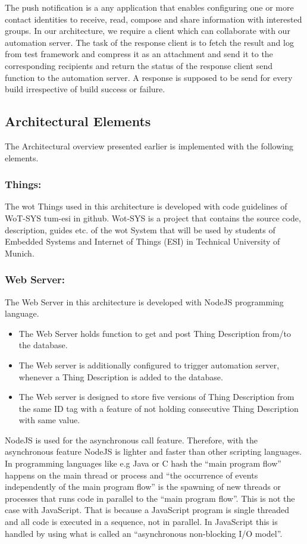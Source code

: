 \documentclass[conference]{IEEEtran}
\theoremstyle{definition}
\begin{document}
The push notification is a any application that enables configuring one or more contact identities to receive, read, compose and share information with interested groups. 
In our architecture, we require a client which can collaborate with our automation server. 
The task of the response client is to fetch the result and log from test framework and compress it as an attachment and send it to the corresponding recipients and return the status of the response client send function to the automation server. 
A response is supposed to be send for every build irrespective of build success or failure.

\subsection{Architectural Elements}

The Architectural overview presented earlier is implemented with the following elements.

\subsubsection{Things:}

The \ac{wot} Things used in this architecture is developed with code guidelines of WoT-SYS tum-esi in github. 
Wot-SYS is a project that contains the source code, description, guides etc. of the \ac{wot} System that will be used by students of Embedded Systems and Internet of Things (ESI) in Technical University of Munich.

\subsubsection{Web Server:}
  
The Web Server in this architecture is developed with NodeJS programming language. 
\begin{itemize}
  \item The Web Server holds function to get and post Thing Description from/to the database.
  \item The Web server is additionally configured to trigger automation server, whenever a Thing Description is added to the database.
  \item The Web server is designed to store five versions of Thing Description from the same ID tag with a feature of not holding consecutive Thing Description with same value.
\end{itemize} 

NodeJS is used for the asynchronous call feature. 
Therefore, with the asynchronous feature NodeJS is lighter and faster than other scripting languages. 
In programming languages like e.g Java or C hash the “main program flow” happens on the main thread or process and “the occurrence of events independently of the main program flow” is the spawning of new threads or processes that runs code in parallel to the “main program flow”. 
This is not the case with JavaScript. 
That is because a JavaScript program is single threaded and all code is executed in a sequence, not in parallel. 
In JavaScript this is handled by using what is called an “asynchronous non-blocking I/O model”.
\end{document}
